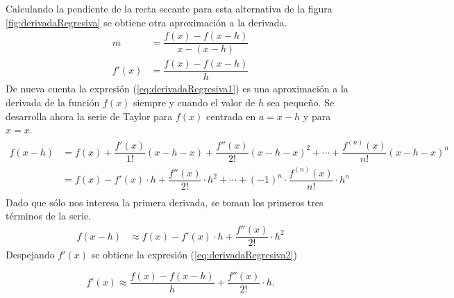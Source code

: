 Calculando la pendiente de la recta secante para esta alternativa de la figura \ref{fig:derivadaRegresiva} se obtiene otra aproximación 
a la derivada.
\begin{align}
	m &= \dfrac{f(x)-f(x-h)}{x-(x-h)}\nonumber\\
	f'(x) &= \dfrac{f(x)-f(x-h)}{h}
	\label{eq:derivadaRegresiva1}
\end{align}
De nueva cuenta la expresión (\ref{eq:derivadaRegresiva1}) es una aproximación a la derivada de la función $f(x)$ 
siempre y cuando el valor de $h$ sea pequeño. Se desarrolla ahora la serie de Taylor para $f(x)$ centrada en $a=x-h$ y para $x=x$.
\begin{align*}
	f(x-h) &= f(x) + \dfrac{f'(x)}{1!}(x-h-x) + \dfrac{f''(x)}{2!}(x-h-x)^2 + \cdots + \dfrac{f^{(n)}(x)}{n!}(x-h-x)^n\\
		&= f(x) - f'(x)\cdot h + \dfrac{f''(x)}{2!}\cdot h^2 + \cdots + (-1)^n\cdot\dfrac{f^{(n)}(x)}{n!}\cdot h^n\\
\end{align*}
Dado que sólo nos interesa la primera derivada, se toman los primeros tres términos de la serie.
\begin{align*}
	f(x-h) &\approx f(x) - f'(x)\cdot h + \dfrac{f''(x)}{2!}\cdot h^2
\end{align*}
Despejando $f'(x)$  se obtiene la expresión (\ref{eq:derivadaRegresiva2})
\begin{definitionT}
	\begin{equation}
		f'(x) \approx \dfrac{f(x)-f(x-h)}{h} + \dfrac{f''(x)}{2!}\cdot h.
	\label{eq:derivadaRegresiva2}
	\end{equation}
\end{definitionT}

